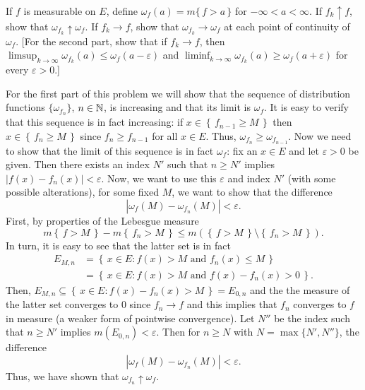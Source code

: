 \begin{problem}
  If \(f\) is measurable on \(E\), define \(\omega_f(a)=m\{\,f>a\,\}\) for
  \(-\infty<a<\infty\). If \(f_k\uparrow f\), show that
  \(\omega_{f_k}\uparrow\omega_f\). If \(f_k\to f\), show that
  \(\omega_{f_k}\to\omega_f\) at each point of continuity of
  \(\omega_f\). [For the second part, show that if \(f_k\to f\), then
  \(\limsup_{k\to\infty}\omega_{f_k}(a)\leq\omega_f(a-\varepsilon)\) and
  \(\liminf_{k\to\infty}\omega_{f_k}(a)\geq\omega_f(a+\varepsilon)\) for
  every \(\varepsilon>0\).]
\end{problem}
\begin{solution}
  For the first part of this problem we will show that the sequence of
  distribution functions \(\{\omega_{f_n}\}\), \(n\in\mathbb{N}\), is increasing
  and that its limit is \(\omega_f\). It is easy to verify that this
  sequence is in fact increasing: if
  \(x\in\left\{\,f_{n-1}\geq M\,\right\}\) then
  \(x\in\left\{\,f_n\geq M\,\right\}\) since \(f_n\geq f_{n-1}\) for all
  \(x\in E\). Thus, \(\omega_{f_n}\geq\omega_{f_{n-1}}\). Now we need to
  show that the limit of this sequence is in fact \(\omega_f\): fix an
  \(x\in E\) and let \(\varepsilon>0\) be given. Then there exists an index
  \(N'\) such that \(n\geq N'\) implies \(|f(x)-f_n(x)|<\varepsilon\). Now,
  we want to use this \(\varepsilon\) and index \(N'\) (with some possible
  alterations), for some fixed \(M\), we want to show that the difference
  \[
    \left| \omega_f(M)-\omega_{f_n}(M) \right|<\varepsilon.
  \]
  First, by properties of the Lebesgue measure
  \[
    m\left\{\,f>M\,\right\}-m\left\{\,f_n>M\,\right\}\leq
    m\left(\left\{\,f>M\,\right\}\setminus \left\{\,f_n>M\,\right\}\right).
  \]
  In turn, it is easy to see that the latter set is in fact
  \begin{align*}
    E_{M,n}
    &=\left\{\,x\in E:\text{\(f(x)>M\) and \(f_n(x)\leq M\)}\,\right\}\\
    &=\left\{\,x\in E:\text{\(f(x)>M\) and \(f(x)-f_n(x)>0\)}\,\right\}.
  \end{align*}
  Then, \(E_{M,n}\subseteq\left\{\,x\in E:f(x)-f_n(x)>M\,\right\}=E_{0,n}\)
  and the the measure of the latter set converges to \(0\) since
  \(f_n\to f\) and this implies that \(f_n\) converges to \(f\) in measure
  (a weaker form of pointwise convergence). Let \(N''\) be the index such
  that \(n\geq N'\) implies \(m(E_{0,n})<\varepsilon\). Then for
  \(n\geq N\) with \(N=\max\{N',N''\}\), the difference
  \[
    \left| \omega_f(M)-\omega_{f_n}(M) \right|<\varepsilon.
  \]
  Thus, we have shown that \(\omega_{f_n}\uparrow\omega_f\).
\end{solution}

